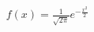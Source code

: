 \documentclass[preview]{standalone}
\begin{document}
\begin{align*}
f(x) = \frac{1}{\sqrt{2\pi}} e^{-\frac{x^2}{2}}
\end{align*}
\end{document}
